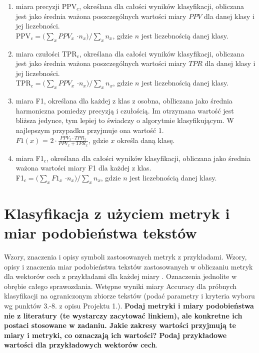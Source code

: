\documentclass{classrep}
\begin{document}
\begin{enumerate}
\item miara precyzji PPV$_c$, określana dla całości wyników klasyfikacji, obliczana jest jako średnia ważona poszczególnych wartości miary \(PPV\) dla danej klasy i jej liczebności.
\\

PPV$_c = (\sum_{x} PPV$$_x$ $ \cdot n_{x}) / \sum_{x} n_{x}$, gdzie $n$ jest liczebnością danej klasy.\\

\item miara czułości TPR$_c$, określana dla całości wyników klasyfikacji, obliczana jest jako średnia ważona poszczególnych wartości miary \(TPR\) dla danej klasy i jej liczebności.\\

TPR$_c = (\sum_{x} PPV$$_x$ $ \cdot n_{x}) / \sum_{x} n_{x}$, gdzie $n$ jest liczebnością danej klasy.\\

\item miara F1, określana dla każdej z klas z osobna, oblliczana jako średnia harmoniczna pomiedzy precyzją i czułością.
Im otrzymana wartość jest bliższa jedynce, tym lepiej to świadczy o algorytmie klasyfikującym. W najlepszym przypadku przyjmuje ona wartość 1. \\

$F1(x)$ = $2 \cdot \frac{PPV_{x} \cdot TPR_{x}} {PPV_{x} + TPR_{x}}$, gdzie \(x\) określa daną klasę.\\

\item miara F1$_c$, określana dla całości wyników klasyfikacji, obliczana jako średnia ważona wartości miary F1 dla każdej z klas. \\

F1$_c = (\sum_{x} F1$$_x$ $ \cdot n_{x}) / \sum_{x} n_{x}$, gdzie $n$ jest liczebnością danej klasy.

\end{enumerate}



\section{Klasyfikacja z użyciem metryk i miar podobieństwa tekstów}
Wzory, znaczenia i opisy symboli zastosowanych metryk z
przykładami. Wzory, opisy i znaczenia miar
podobieństwa tekstów zastosowanych w obliczaniu metryk dla wektorów cech z
przykładami dla każdej miary \cite{niewiadomski08}.  Oznaczenia jednolite w obrębie całego sprawozdania.  Wstępne wyniki miary Accuracy dla próbnych klasyfikacji na ograniczonym zbiorze tekstów (podać parametry i kryteria
wyboru wg punktów 3.-8. z opisu Projektu 1.). {\bf Podaj metryki i miary
podobieństwa nie z literatury (te wystarczy zacytować linkiem), ale konkretne ich
postaci stosowane w zadaniu. Jakie zakresy wartości przyjmują te miary i
metryki, co oznaczają ich wartości? Podaj przykładowe wartości dla przykładowych wektorów cech}. \\ 
\end{document}
